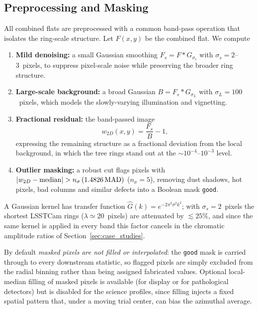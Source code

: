 \subsection{Preprocessing and Masking}

All combined flats are preprocessed with a common band-pass operation that isolates the
ring-scale structure. Let $F(x,y)$ be the combined flat. We compute
%
\begin{enumerate}
\item \textbf{Mild denoising:} a small Gaussian smoothing $F_s = F * G_{\sigma_s}$ with
$\sigma_s = 2$--3~pixels, to suppress pixel-scale noise while preserving the broader ring
structure.
\item \textbf{Large-scale background:} a broad Gaussian $B = F_s * G_{\sigma_L}$ with
$\sigma_L = 100$~pixels, which models the slowly-varying illumination and vignetting.
\item \textbf{Fractional residual:} the band-passed image
%
\begin{equation}
w_{2D}(x,y) = \frac{F_s}{B} - 1,
\end{equation}
%
expressing the remaining structure as a fractional deviation from the local background, in
which the tree rings stand out at the $\sim10^{-4}$--$10^{-3}$ level.
\item \textbf{Outlier masking:} a robust cut flags pixels with
$|w_{2D} - {\rm median}| > n_\sigma\,(1.4826\,{\rm MAD})$ ($n_\sigma = 5$), removing dust
shadows, hot pixels, bad columns and similar defects into a Boolean mask \texttt{good}.
\end{enumerate}
%
A Gaussian kernel has transfer function $\hat{G}(k)=e^{-2\pi^2\sigma^2 k^2}$; with
$\sigma_s = 2$~pixels the shortest LSSTCam rings ($\lambda\simeq 20$~pixels) are attenuated
by $\lesssim 25\%$, and since the same kernel is applied in every band this factor cancels
in the chromatic amplitude ratios of Section~\ref{sec:case_studies}.

By default \emph{masked pixels are not filled or interpolated}: the \texttt{good} mask is
carried through to every downstream statistic, so flagged pixels are simply excluded from the
radial binning rather than being assigned fabricated values. Optional local-median filling of
masked pixels is available (for display or for pathological detectors) but is disabled for the
science profiles, since filling injects a fixed spatial pattern that, under a moving trial
center, can bias the azimuthal average.

